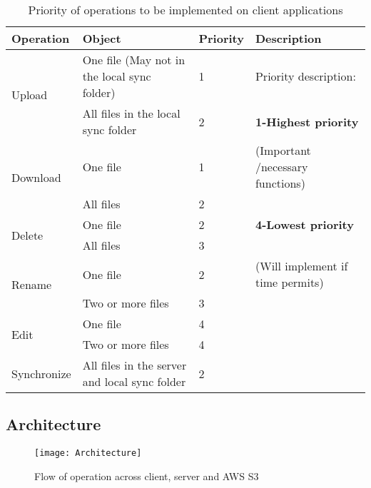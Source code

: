 \bgroup
\def\arraystretch{1.2}
\begin{table}[H]
\centering
\begin{tabular}{|m{2cm}|m{2cm}|m{1.5cm}|m{2.5cm}|}
\hline
Operation & Object & Priority & Description \\
\hline
\multirow{2}{*}{Upload}&{One file (May not in the local sync folder)}&1&{Priority description:}\\
\cline{2-3}
&All files in the local sync folder&2&{\textbf{1-Highest priority}}\\
\cline{1-3}
\multirow{2}{*}{Download}&{One file}&1&{(Important /necessary functions)}\\
\cline{2-3}
&All files&2&{}\\
\cline{1-3}
\multirow{2}{*}{Delete}&{One file}&2&{\textbf{4-Lowest priority}}\\
\cline{2-3}
&All files&3&{}\\
\cline{1-3}
\multirow{2}{*}{Rename}&{One file}&2&{(Will implement if time permits)}\\
\cline{2-3}
&Two or more files&3&{}\\
\cline{1-3}
\multirow{2}{*}{Edit}&{One file}&4&{}\\
\cline{2-3}
&Two or more files&4&{}\\
\cline{1-3}
\multirow{1}{*}{Synchronize}&{All files in the server and local sync folder}&2&{}\\
\cline{1-4}
\bottomrule
\end{tabular}
\caption{Priority of operations to be implemented on client applications}
\end{table}
\egroup

\subsection{Architecture}

\begin{figure}[h!]
\centering
\texttt{[image: Architecture]}
\caption{Flow of operation across client, server and AWS S3}
\end{figure}


